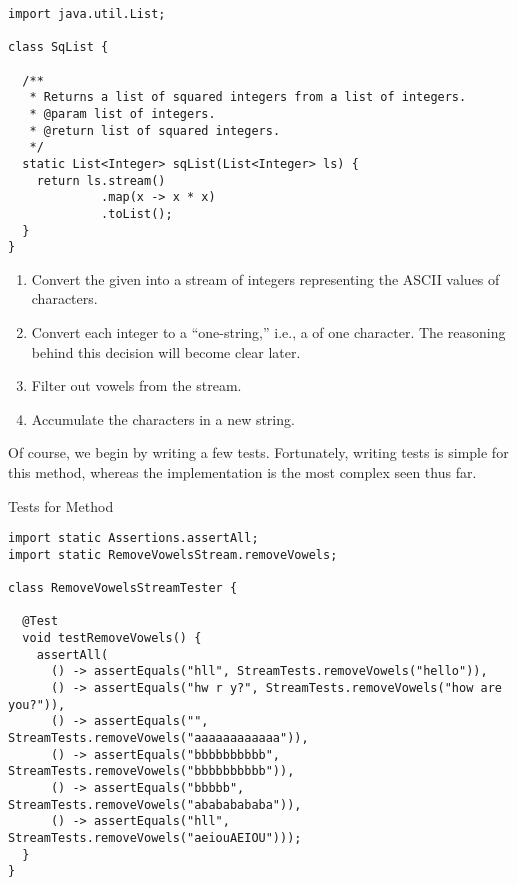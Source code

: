 \begin{cl}[]{}
\begin{lstlisting}[language=MyJava]
import java.util.List;

class SqList {

  /**
   * Returns a list of squared integers from a list of integers.
   * @param list of integers.
   * @return list of squared integers.
   */
  static List<Integer> sqList(List<Integer> ls) {
    return ls.stream()
             .map(x -> x * x)
             .toList();
  }
}
\end{lstlisting}    
\end{cl}


\begin{enumerate}
    \item Convert the given  into a stream of integers representing the ASCII values of characters.
    \item Convert each integer to a ``one-string,'' i.e., a  of one character. The reasoning behind this decision will become clear later.
    \item Filter out vowels from the stream.
    \item Accumulate the characters in a new string.
\end{enumerate}

Of course, we begin by writing a few tests. Fortunately, writing tests is simple for this method, whereas the implementation is the most complex seen thus far.

\begin{cl}[]{Tests for  Method}
\begin{lstlisting}[language=MyJava]
import static Assertions.assertAll;
import static RemoveVowelsStream.removeVowels;

class RemoveVowelsStreamTester {
  
  @Test
  void testRemoveVowels() {
    assertAll(
      () -> assertEquals("hll", StreamTests.removeVowels("hello")),
      () -> assertEquals("hw r y?", StreamTests.removeVowels("how are you?")),
      () -> assertEquals("", StreamTests.removeVowels("aaaaaaaaaaaa")),
      () -> assertEquals("bbbbbbbbbb", StreamTests.removeVowels("bbbbbbbbbb")),
      () -> assertEquals("bbbbb", StreamTests.removeVowels("abababababa")),
      () -> assertEquals("hll", StreamTests.removeVowels("aeiouAEIOU")));
  }
}
\end{lstlisting}
\end{cl}

